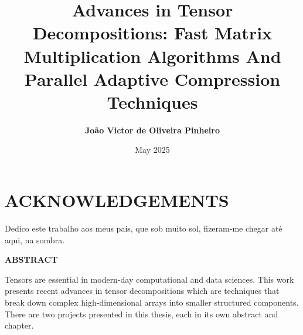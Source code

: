 \documentclass[MS]{wfuthesis}
\title{\textbf{Advances in Tensor Decompositions: Fast Matrix Multiplication Algorithms And Parallel Adaptive Compression Techniques}}
\author{\textbf{João Victor de Oliveira Pinheiro}}
\date{May 2025}
\begin{document}
    
    \maketitle
    \section*{\textbf{ACKNOWLEDGEMENTS}} 
        Dedico este trabalho aos meus pais, que sob muito sol, fizeram-me chegar até aqui, na sombra.
        







    \tableofcontents
    \newpage





    \listoffigures
    \newpage






    \printnomenclature
    \newpage





    \begin{center}
        \textbf{ABSTRACT}
    \end{center}
    Tensors are essential in modern-day computational and data sciences. This
    work presents recent advances in tensor decompositions which are techniques
    that break down complex high-dimensional arrays into smaller structured
    components. There are two projects presented in this thesis, each in its own
    abstract and chapter. 
\end{document}
